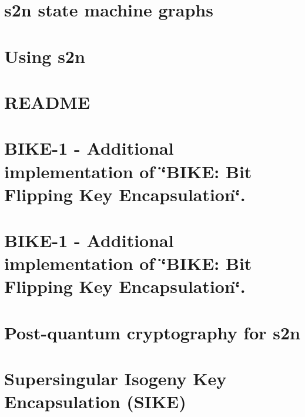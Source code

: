 \documentclass[twoside]{book}
\newcommand{\+}{\discretionary{\mbox{\scriptsize$\hookleftarrow$}}{}{}}
\begin{document}
\chapter{s2n state machine graphs}
\label{md_crt_aws_crt_cpp_crt_s2n_docs__s_t_a_t_e__m_a_c_h_i_n_e}

\chapter{Using s2n}
\label{md_crt_aws_crt_cpp_crt_s2n_docs__u_s_a_g_e__g_u_i_d_e}

\chapter{README}
\label{md_crt_aws_crt_cpp_crt_s2n_libcrypto_build__r_e_a_d_m_e}

\chapter{BIKE-\/1 -\/ Additional implementation of \char`\"{}\+BIKE\+: Bit Flipping Key Encapsulation\char`\"{}.}
\label{md_crt_aws_crt_cpp_crt_s2n_pq_crypto_bike_r1__r_e_a_d_m_e}

\chapter{BIKE-\/1 -\/ Additional implementation of \char`\"{}\+BIKE\+: Bit Flipping Key Encapsulation\char`\"{}.}
\label{md_crt_aws_crt_cpp_crt_s2n_pq_crypto_bike_r2__r_e_a_d_m_e}

\chapter{Post-\/quantum cryptography for s2n}
\label{md_crt_aws_crt_cpp_crt_s2n_pq_crypto__r_e_a_d_m_e}

\chapter{Supersingular Isogeny Key Encapsulation (SIKE)}
\label{md_crt_aws_crt_cpp_crt_s2n_pq_crypto_sike_r1__readme}

\end{document}
